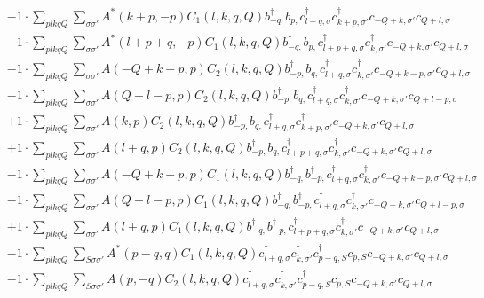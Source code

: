 \begin{align*}
	&-1 \cdot \sum_{ p l k q Q } \sum_{ \sigma \sigma' } A^*( k+p, -p )  C_1( l, k, q, Q )   b_{ -q, }^\dagger  b_{ p, } c_{ l+q, \sigma }^\dagger  c_{ k+p, \sigma' }^\dagger  c_{ -Q+k, \sigma' } c_{ Q+l, \sigma }  \\
	&-1 \cdot \sum_{ p l k q Q } \sum_{ \sigma \sigma' } A^*( l+p+q, -p )  C_1( l, k, q, Q )   b_{ -q, }^\dagger  b_{ p, } c_{ l+p+q, \sigma }^\dagger  c_{ k, \sigma' }^\dagger  c_{ -Q+k, \sigma' } c_{ Q+l, \sigma }  \\
	&-1 \cdot \sum_{ p l k q Q } \sum_{ \sigma \sigma' } A( -Q+k-p, p )  C_2( l, k, q, Q )   b_{ -p, }^\dagger  b_{ q, } c_{ l+q, \sigma }^\dagger  c_{ k, \sigma' }^\dagger  c_{ -Q+k-p, \sigma' } c_{ Q+l, \sigma }  \\
	&-1 \cdot \sum_{ p l k q Q } \sum_{ \sigma \sigma' } A( Q+l-p, p )  C_2( l, k, q, Q )   b_{ -p, }^\dagger  b_{ q, } c_{ l+q, \sigma }^\dagger  c_{ k, \sigma' }^\dagger  c_{ -Q+k, \sigma' } c_{ Q+l-p, \sigma }  \\
	&+1 \cdot \sum_{ p l k q Q } \sum_{ \sigma \sigma' } A( k, p )  C_2( l, k, q, Q )   b_{ -p, }^\dagger  b_{ q, } c_{ l+q, \sigma }^\dagger  c_{ k+p, \sigma' }^\dagger  c_{ -Q+k, \sigma' } c_{ Q+l, \sigma }  \\
	&+1 \cdot \sum_{ p l k q Q } \sum_{ \sigma \sigma' } A( l+q, p )  C_2( l, k, q, Q )   b_{ -p, }^\dagger  b_{ q, } c_{ l+p+q, \sigma }^\dagger  c_{ k, \sigma' }^\dagger  c_{ -Q+k, \sigma' } c_{ Q+l, \sigma }  \\
	&-1 \cdot \sum_{ p l k q Q } \sum_{ \sigma \sigma' } A( -Q+k-p, p )  C_1( l, k, q, Q )   b_{ -q, }^\dagger  b_{ -p, }^\dagger  c_{ l+q, \sigma }^\dagger  c_{ k, \sigma' }^\dagger  c_{ -Q+k-p, \sigma' } c_{ Q+l, \sigma }  \\
	&-1 \cdot \sum_{ p l k q Q } \sum_{ \sigma \sigma' } A( Q+l-p, p )  C_1( l, k, q, Q )   b_{ -q, }^\dagger  b_{ -p, }^\dagger  c_{ l+q, \sigma }^\dagger  c_{ k, \sigma' }^\dagger  c_{ -Q+k, \sigma' } c_{ Q+l-p, \sigma }  \\
	&+1 \cdot \sum_{ p l k q Q } \sum_{ \sigma \sigma' } A( l+q, p )  C_1( l, k, q, Q )   b_{ -q, }^\dagger  b_{ -p, }^\dagger  c_{ l+p+q, \sigma }^\dagger  c_{ k, \sigma' }^\dagger  c_{ -Q+k, \sigma' } c_{ Q+l, \sigma }  \\
	&-1 \cdot \sum_{ p l k q Q } \sum_{ S \sigma \sigma' } A^*( p-q, q )  C_1( l, k, q, Q )   c_{ l+q, \sigma }^\dagger  c_{ k, \sigma' }^\dagger  c_{ p-q, S }^\dagger  c_{ p, S } c_{ -Q+k, \sigma' } c_{ Q+l, \sigma }  \\
	&-1 \cdot \sum_{ p l k q Q } \sum_{ S \sigma \sigma' } A( p, -q )  C_2( l, k, q, Q )   c_{ l+q, \sigma }^\dagger  c_{ k, \sigma' }^\dagger  c_{ p-q, S }^\dagger  c_{ p, S } c_{ -Q+k, \sigma' } c_{ Q+l, \sigma } 
\end{align*}
